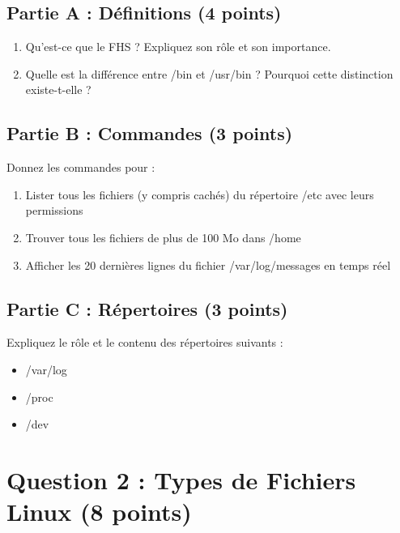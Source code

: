\documentclass[12pt,a4paper]{article}
\begin{document}
\begin{questionbox}
\subsection*{Partie A : Définitions (4 points)}
\begin{enumerate}[label=\alph*)]
    \item Qu'est-ce que le FHS ? Expliquez son rôle et son importance.
    \item Quelle est la différence entre /bin et /usr/bin ? Pourquoi cette distinction existe-t-elle ?
\end{enumerate}

\subsection*{Partie B : Commandes (3 points)}
Donnez les commandes pour :
\begin{enumerate}[label=\alph*)]
    \item Lister tous les fichiers (y compris cachés) du répertoire /etc avec leurs permissions
    \item Trouver tous les fichiers de plus de 100 Mo dans /home
    \item Afficher les 20 dernières lignes du fichier /var/log/messages en temps réel
\end{enumerate}

\subsection*{Partie C : Répertoires (3 points)}
Expliquez le rôle et le contenu des répertoires suivants :
\begin{itemize}
    \item /var/log
    \item /proc
    \item /dev
\end{itemize}
\end{questionbox}

\newpage


\section{Question 2 : Types de Fichiers Linux (8 points)}
\end{document}
